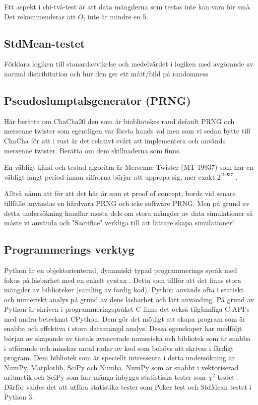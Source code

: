 \documentclass[swedish,a4paper]{article}
\begin{document}
Ett aspekt i chi-två-test är att data mängderna som testas inte kan vara för små. Det rekommenderas att $O_i$ inte är mindre en 5.

\subsection{StdMean-testet}
Förklara logiken till stanardavvikelse och medelvärdet
i logiken med avgörande av normal distribitution och hur den ger ett mått/bild på randomness

\subsection{Pseudoslumptalsgenerator (PRNG)}
Här berätta om ChaCha20 \parencite{chacha} den som är biobliotekes rand
\parencite{rand_crate} default PRNG och mersenne twister som egentligen var första
hands val
\parencite{mersenne_twister} men som vi sedan bytte till ChaCha för att i rust
är det relativt svårt att  implementera och använda mersenne twister. Berätta om
dem skillnaderna som finns.


En väldigt känd och testad algoritm är Mersenne Twister (MT 19937) som
har en väldigt långt period innan siffrorna börjar att upprepa sig, mer
exakt $2^{19937}$ \parencite{mersenne_twister}.

Alltså nämn att för att det här är som et proof of concept, borde vid
senare tillfälle användas en hårdvara PRNG och icke software PRNG.
Men på grund av detta undersökning handlar mesta dels om stora mängder av data
simulationer så måste vi använda och "Sacrifice" verkliga till att lättare
skapa simulationer!
\subsection{Programmerings verktyg}
Python är en objektorienterad, dynamiskt typad programmerings språk med
fokus på läsbarhet med en enkelt syntax \parencite{python}. Detta  som tillför att det finns stora
mängder av biblioteker (samling av färdig kod).
Python används ofta i statiskt och numeriskt analys på grund av dens
läsbarhet och lätt använding. På grund av Python är skriven i
programmeringspråket C finns det också tilgännliga C API's med andra
betecknat CPython. Dem gör det möjligt att skapa program som är snabba
och effektiva i stora datamängd analys. Dessa egenskaper har medföljt
början av skapande av tiotals avancerade numeriska och
bibliotek som är snabba i utförande och minskar antal radar av kod som
behövs att skrivas i färdigt program. Dem bibliotek som är speciellt
intressenta i detta undersökning är NumPy, Matplotlib, SciPy och Numba.
NumPy som är snabbt i vektoriserad aritmetik och SciPy som har många
inbygga statistiska tester som $\chi^2$-testet \parencite{numpy, scipy}.
Därför valdes det att utföra statistika tester som Poker test och
StdMean testet i Python 3.
\end{document}
